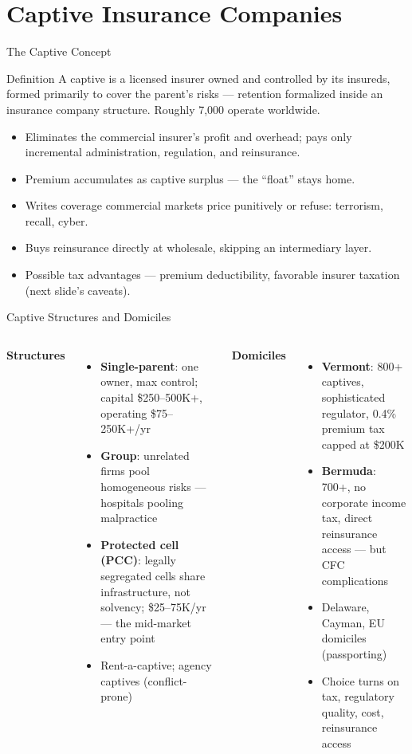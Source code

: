 \documentclass[11pt, aspectratio=169]{beamer}
\begin{document}
\section{Captive Insurance Companies}

\begin{frame}{The Captive Concept}
\begin{block}{Definition}
A \alert{captive} is a licensed insurer owned and controlled by its insureds, formed primarily to cover the parent's risks --- retention formalized inside an insurance company structure. Roughly 7,000 operate worldwide.
\end{block}
\medskip
\begin{itemize}
  \item Eliminates the commercial insurer's profit and overhead; pays only incremental administration, regulation, and reinsurance.
  \item Premium accumulates as captive surplus --- the \alert{``float'' stays home}.
  \item Writes coverage commercial markets price punitively or refuse: terrorism, recall, cyber.
  \item Buys reinsurance directly at wholesale, skipping an intermediary layer.
  \item Possible tax advantages --- premium deductibility, favorable insurer taxation (next slide's caveats).
\end{itemize}
\end{frame}

\begin{frame}{Captive Structures and Domiciles}
\begin{columns}[T]
\textbf{Structures}
\begin{itemize}
  \item \textbf{Single-parent}: one owner, max control; capital \$250--500K+, operating \$75--250K+/yr
  \item \textbf{Group}: unrelated firms pool homogeneous risks --- hospitals pooling malpractice
  \item \textbf{Protected cell (PCC)}: legally segregated cells share infrastructure, not solvency; \$25--75K/yr --- the mid-market entry point
  \item Rent-a-captive; agency captives (conflict-prone)
\end{itemize}
\textbf{Domiciles}
\begin{itemize}
  \item \textbf{Vermont}: 800+ captives, sophisticated regulator, 0.4\% premium tax capped at \$200K
  \item \textbf{Bermuda}: 700+, no corporate income tax, direct reinsurance access --- but CFC complications
  \item Delaware, Cayman, EU domiciles (passporting)
  \item Choice turns on tax, regulatory quality, cost, reinsurance access
\end{itemize}
\end{columns}
\end{frame}
\end{document}
